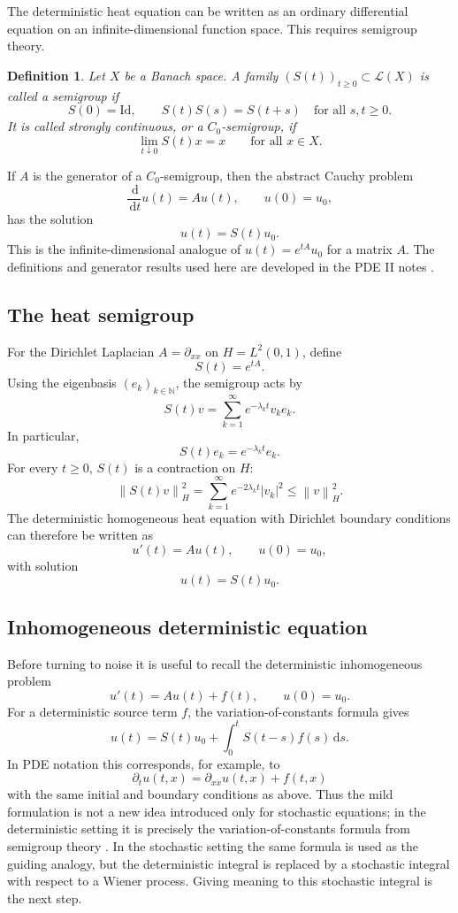 \documentclass[11pt,a4paper]{article}
\newtheorem{definition}[theorem]{Definition}
\newcommand{\N}{\mathbb{N}}
\newcommand{\dd}{\,\mathrm{d}}
\newcommand{\Id}{\mathrm{Id}}
\newcommand{\norm}[1]{\left\lVert #1 \right\rVert}
\begin{document}
The deterministic heat equation can be written as an ordinary differential
equation on an infinite-dimensional function space. This requires semigroup
theory.

\begin{definition}
Let \(X\) be a Banach space. A family \((S(t))_{t\ge0}\subset\mathcal L(X)\) is
called a semigroup if
\[
  S(0)=\Id,
  \qquad
  S(t)S(s)=S(t+s)
  \quad\text{for all }s,t\ge0.
\]
It is called strongly continuous, or a \(C_0\)-semigroup, if
\[
  \lim_{t\downarrow0}S(t)x=x
  \qquad\text{for all }x\in X.
\]
\end{definition}

If \(A\) is the generator of a \(C_0\)-semigroup, then the abstract Cauchy problem
\[
  \frac{\dd}{\dd t}u(t)=Au(t),
  \qquad u(0)=u_0,
\]
has the solution
\[
  u(t)=S(t)u_0.
\]
This is the infinite-dimensional analogue of \(u(t)=e^{tA}u_0\) for a matrix
\(A\). The definitions and generator results used here are developed in the PDE
II notes \cite{stinnerPDE2}.

\subsection{The heat semigroup}

For the Dirichlet Laplacian \(A=\partial_{xx}\) on \(H=L^2(0,1)\), define
\[
  S(t)=e^{tA}.
\]
Using the eigenbasis \((e_k)_{k\in\N}\), the semigroup acts by
\[
  S(t)v
  =
  \sum_{k=1}^{\infty}e^{-\lambda_k t}v_k e_k.
\]
In particular,
\[
  S(t)e_k=e^{-\lambda_k t}e_k.
\]
For every \(t\ge0\), \(S(t)\) is a contraction on \(H\):
\[
  \norm{S(t)v}_H^2
  =
  \sum_{k=1}^{\infty}e^{-2\lambda_k t}|v_k|^2
  \le
  \norm{v}_H^2.
\]
The deterministic homogeneous heat equation with Dirichlet boundary conditions
can therefore be written as
\[
  u'(t)=Au(t),
  \qquad u(0)=u_0,
\]
with solution
\[
  u(t)=S(t)u_0.
\]

\subsection{Inhomogeneous deterministic equation}

Before turning to noise it is useful to recall the deterministic inhomogeneous
problem
\[
  u'(t)=Au(t)+f(t),
  \qquad u(0)=u_0.
\]
For a deterministic source term \(f\), the variation-of-constants formula gives
\[
  u(t)=S(t)u_0+\int_0^t S(t-s)f(s)\dd s.
\]
In PDE notation this corresponds, for example, to
\[
  \partial_t u(t,x)=\partial_{xx}u(t,x)+f(t,x)
\]
with the same initial and boundary conditions as above. Thus the mild
formulation is not a new idea introduced only for stochastic equations; in the
deterministic setting it is precisely the variation-of-constants formula from
semigroup theory \cite{stinnerPDE2}. In the stochastic setting the same formula
is used as the guiding analogy, but the deterministic integral is replaced by a
stochastic integral with respect to a Wiener process. Giving meaning to this
stochastic integral is the next step.
\end{document}
